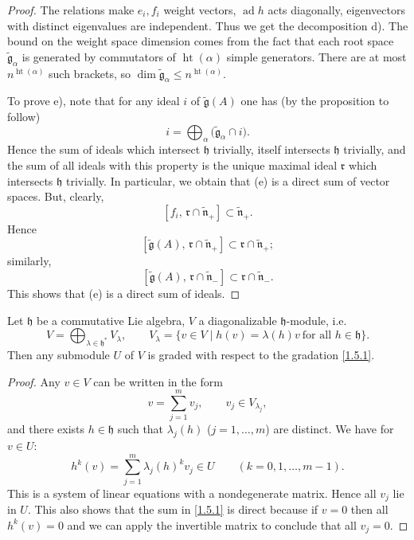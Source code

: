 \documentclass[12pt]{article}
\begin{document}
\begin{proof}
    The relations make $e_i, f_i$ weight vectors, $\operatorname{ad} h$ acts diagonally, eigenvectors with distinct eigenvalues are independent. Thus we get the decomposition d). The bound on the weight space dimension comes from the fact that each root space $\tilde{\mathfrak{g}}_\alpha$ is generated by commutators of $\operatorname{ht}(\alpha)$ simple generators. There are at most $n^{\operatorname{ht}(\alpha)}$ such brackets, so $\dim \tilde{\mathfrak{g}}_\alpha \leq n^{\operatorname{ht}(\alpha)}$.

    To prove e), note that for any ideal $i$ of $\tilde{\mathfrak{g}}(A)$ one has (by the proposition to follow)
    \[
        i = \bigoplus_{\alpha} \bigl(\tilde{\mathfrak{g}}_{\alpha} \cap i \bigr).
    \]
    Hence the sum of ideals which intersect $\mathfrak{h}$ trivially, itself intersects $\mathfrak{h}$ trivially, and the sum of all ideals with this property is the unique maximal ideal $\mathfrak{r}$ which intersects $\mathfrak{h}$ trivially. In particular, we obtain that (e) is a direct sum of vector spaces. But, clearly,
    \[
        [f_i, \, \mathfrak{r} \cap \tilde{\mathfrak{n}}_+] \subset \tilde{\mathfrak{n}}_+.
    \]
    Hence
    \[
        [\tilde{\mathfrak{g}}(A), \, \mathfrak{r} \cap \tilde{\mathfrak{n}}_+]
        \subset \mathfrak{r} \cap \tilde{\mathfrak{n}}_+;
    \]
    similarly,
    \[
        [\tilde{\mathfrak{g}}(A), \, \mathfrak{r} \cap \tilde{\mathfrak{n}}_-]
        \subset \mathfrak{r} \cap \tilde{\mathfrak{n}}_-.
    \]
    This shows that (e) is a direct sum of ideals.
\end{proof}

\begin{proposition}
    Let $\mathfrak{h}$ be a commutative Lie algebra, $V$ a diagonalizable
    $\mathfrak{h}$-module, i.e.
    \begin{equation}\label{1.5.1}
        V = \bigoplus_{\lambda \in \mathfrak{h}^*} V_\lambda,
        \qquad
        V_\lambda = \{ v \in V \mid h(v) = \lambda(h)v \ \text{for all } h \in \mathfrak{h} \}.
    \end{equation}
    Then any submodule $U$ of $V$ is graded with respect to the gradation \eqref{1.5.1}.
\end{proposition}

\begin{proof}
    Any $v \in V$ can be written in the form
    \[
        v = \sum_{j=1}^m v_j, \qquad v_j \in V_{\lambda_j},
    \]
    and there exists $h \in \mathfrak{h}$ such that $\lambda_j(h)$
    ($j=1,\dots,m$) are distinct. We have for $v \in U$:
    \[
        h^k(v) = \sum_{j=1}^m \lambda_j(h)^k v_j \in U
        \qquad (k=0,1,\dots,m-1).
    \]
    This is a system of linear equations with a nondegenerate matrix. Hence all $v_j$ lie in $U$. This also shows that the sum in \eqref{1.5.1} is direct because if $v=0$ then all $h^k(v) = 0$ and we can apply the invertible matrix to conclude that all $v_j = 0$.
\end{proof}
\end{document}

